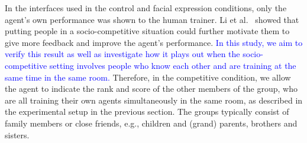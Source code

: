 In the interfaces used in the control and facial expression conditions, only the agent's own performance was shown to the human trainer. Li et al.\ \cite{li2014learning} showed that putting people in a socio-competitive situation could further motivate them to give more feedback and improve the agent's performance. \textcolor{blue}{In this study, we aim to verify this result as well as investigate how it plays out when the socio-competitive setting involves people who know each other and are training at the same time in the same room.} %
Therefore, in the competitive condition, we allow the agent to indicate the rank and score of the other members of the group, who are all training their own agents simultaneously in the same room, as described in the experimental setup in the previous section. The groups typically consist of family members or close friends, e.g., children and (grand) parents, %
 brothers and sisters. %


%

